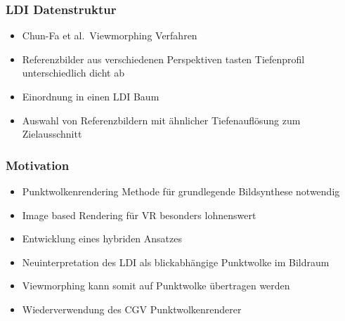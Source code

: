 \documentclass[aspectratio=169]{beamer}
\begin{document}
\begin{frame}
    \frametitle{LDI Datenstruktur}
    \begin{itemize}
        \item Chun-Fa et al.\ Viewmorphing Verfahren
        \item Referenzbilder aus verschiedenen Perspektiven tasten Tiefenprofil unterschiedlich dicht ab
        \item Einordnung in einen LDI Baum
        \item Auswahl von Referenzbildern mit ähnlicher Tiefenauflösung zum Zielausschnitt
    \end{itemize}
\end{frame}

\begin{frame}
    \frametitle{Motivation}
    \begin{itemize}
        \item Punktwolkenrendering Methode für grundlegende Bildsynthese notwendig
        \item Image based Rendering für VR besonders lohnenswert
        \item Entwicklung eines hybriden Ansatzes
        \item Neuinterpretation des LDI als blickabhängige Punktwolke im Bildraum
        \item Viewmorphing kann somit auf Punktwolke übertragen werden
        \item Wiederverwendung des CGV Punktwolkenrenderer
    \end{itemize}
\end{frame}
\end{document}

